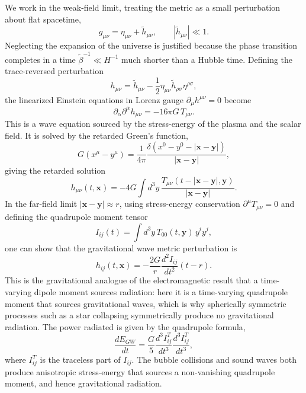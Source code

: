 We work in the weak-field limit, treating the metric as a small
perturbation about flat spacetime,
\begin{equation}
	g_{\mu\nu} = \eta_{\mu\nu} + \tilde h_{\mu\nu},
	\qquad |\tilde h_{\mu\nu}| \ll 1.
\end{equation}
Neglecting the expansion of the universe is justified because the
phase transition completes in a time $\tilde\beta^{-1} \ll H^{-1}$
much shorter than a Hubble time. Defining the trace-reversed
perturbation
\begin{equation}
	h_{\mu\nu} = \tilde h_{\mu\nu}
	- \frac{1}{2}\eta_{\mu\nu}\tilde h_{\rho\sigma}\eta^{\rho\sigma},
\end{equation}
the linearized Einstein equations in Lorenz gauge
$\partial_\mu h^{\mu\nu} = 0$ become
\begin{equation}
	\partial_\alpha\partial^\alpha h_{\mu\nu}
	= -16\pi G\,T_{\mu\nu}.
	\label{eq:linear-gw}
\end{equation}
This is a wave equation sourced by the stress-energy of the plasma and
the scalar field. It is solved by the retarded Green's function,
\begin{equation}
	G(x^\mu - y^\mu) = \frac{1}{4\pi}
	\frac{\delta(x^0 - y^0 - |\mathbf{x}-\mathbf{y}|)}
	{|\mathbf{x}-\mathbf{y}|},
\end{equation}
giving the retarded solution
\begin{equation}
	h_{\mu\nu}(t,\mathbf{x}) = -4G\int d^3y\,
	\frac{T_{\mu\nu}(t-|\mathbf{x}-\mathbf{y}|,\mathbf{y})}
	{|\mathbf{x}-\mathbf{y}|}.
\end{equation}
In the far-field limit $|\mathbf{x}-\mathbf{y}| \approx r$, using
stress-energy conservation $\partial^\mu T_{\mu\nu} = 0$ and
defining the quadrupole moment tensor
\begin{equation}
	I_{ij}(t) = \int d^3y\,T_{00}(t,\mathbf{y})\,y^i y^j,
	\label{eq:quadrupole}
\end{equation}
one can show that the gravitational wave metric perturbation is
\begin{equation}
	\boxed{h_{ij}(t,\mathbf{x})
		= -\frac{2G}{r}\frac{d^2 I_{ij}}{dt^2}(t-r).}
	\label{eq:hij}
\end{equation}
This is the gravitational analogue of the electromagnetic result that
a time-varying dipole moment sources radiation: here it is a
time-varying quadrupole moment that sources gravitational waves, which
is why spherically symmetric processes such as a star collapsing
symmetrically produce no gravitational radiation. The power radiated
is given by the quadrupole formula,
\begin{equation}
	\boxed{\frac{dE_{GW}}{dt}
		= \frac{G}{5}\frac{d^3 I_{ij}^T}{dt^3}
		\frac{d^3 I_{ij}^T}{dt^3},}
	\label{eq:quad_formula}
\end{equation}
where $I_{ij}^T$ is the traceless part of $I_{ij}$. The bubble
collisions and sound waves both produce anisotropic stress-energy that
sources a non-vanishing quadrupole moment, and hence gravitational
radiation.

